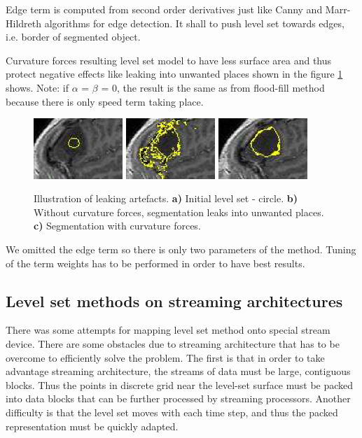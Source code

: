 Edge term is computed from second order derivatives just like Canny and Marr-Hildreth algorithms for edge detection.
It shall to push level set towards edges, i.e. border of segmented object.

Curvature forces resulting level set model to have less surface area and thus protect negative effects like leaking into unwanted places shown in the figure \ref{fg:leaking} shows.
Note: if $\alpha$ = $\beta$ = 0, the result is the same as from flood-fill method because there is only speed term taking place.

\begin{figure}
    \centering
    \includegraphics[width=0.3\textwidth]{data/png/leaking1}
    \includegraphics[width=0.3\textwidth]{data/png/leaking2}
    \includegraphics[width=0.3\textwidth]{data/png/leaking3}
    \caption[Leaking]{Illustration of leaking artefacts.
    \textbf{a)} Initial level set - circle.
    \textbf{b)} Without curvature forces, segmentation leaks into unwanted places.
    \textbf{c)} Segmentation with curvature forces.
}
    \label{fg:leaking}
\end{figure}

We omitted the edge term so there is only two parameters of the method.
Tuning of the term weights has to be performed in order to have best results.

\subsection{Level set methods on streaming architectures}

\par
There was some attempts for mapping level set method onto special stream device.
There are some obstacles due to streaming architecture that has to be overcome to efficiently solve the problem.
The first is that in order to take advantage streaming architecture, the streams of data must be large, contiguous blocks.
Thus the points in discrete grid near the level-set surface must be packed into data blocks that can be further processed by streaming processors.
Another difficulty is that the level set moves with each time step, and thus the packed representation must be quickly adapted.

